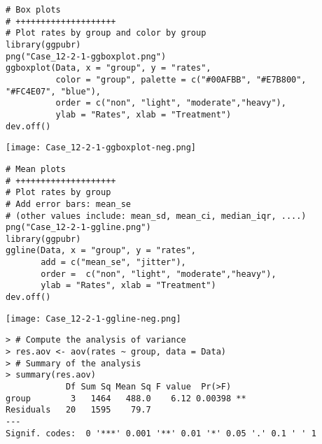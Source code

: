 \begin{frame}[fragile]
	\begin{center}
	\begin{lstlisting}
# Box plots
# ++++++++++++++++++++
# Plot rates by group and color by group
library(ggpubr)
png("Case_12-2-1-ggboxplot.png")
ggboxplot(Data, x = "group", y = "rates",
          color = "group", palette = c("#00AFBB", "#E7B800", "#FC4E07", "blue"),
          order = c("non", "light", "moderate","heavy"),
          ylab = "Rates", xlab = "Treatment")
dev.off()
	\end{lstlisting}
	\vfill
	\texttt{[image: Case\_12-2-1-ggboxplot-neg.png]}
	\end{center}
\end{frame}
\begin{frame}[fragile]
	\begin{center}
	\begin{lstlisting}
# Mean plots
# ++++++++++++++++++++
# Plot rates by group
# Add error bars: mean_se
# (other values include: mean_sd, mean_ci, median_iqr, ....)
png("Case_12-2-1-ggline.png")
library(ggpubr)
ggline(Data, x = "group", y = "rates",
       add = c("mean_se", "jitter"),
       order =  c("non", "light", "moderate","heavy"),
       ylab = "Rates", xlab = "Treatment")
dev.off()
	\end{lstlisting}
	\vfill
	\texttt{[image: Case\_12-2-1-ggline-neg.png]}
	\end{center}
\end{frame}
\begin{frame}[fragile]
\begin{lstlisting}
> # Compute the analysis of variance
> res.aov <- aov(rates ~ group, data = Data)
> # Summary of the analysis
> summary(res.aov)
            Df Sum Sq Mean Sq F value  Pr(>F)
group        3   1464   488.0    6.12 0.00398 **
Residuals   20   1595    79.7
---
Signif. codes:  0 '***' 0.001 '**' 0.01 '*' 0.05 '.' 0.1 ' ' 1
\end{lstlisting}
\end{frame}
